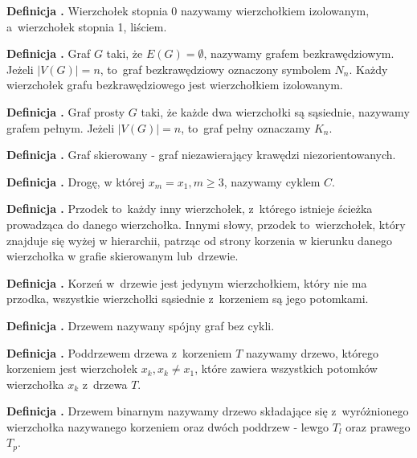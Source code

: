 \noindent
\textbf{Definicja .}
\incrementdefinitionIndex
Wierzchołek stopnia 0 nazywamy wierzchołkiem izolowanym, a~wierzchołek stopnia 1, liściem.

\noindent
\textbf{Definicja .}
\incrementdefinitionIndex
Graf $G$ taki, że $E(G) = \emptyset$, nazywamy grafem bezkrawędziowym. Jeżeli $|V(G)| = n$, to~graf bezkrawędziowy oznaczony symbolem $N_n$.
Każdy wierzchołek grafu bezkrawędziowego jest wierzchołkiem izolowanym.

\noindent
\textbf{Definicja .}
\incrementdefinitionIndex
Graf prosty $G$ taki, że każde dwa wierzchołki są sąsiednie, nazywamy grafem pełnym.
Jeżeli $|V(G)| = n$, to~graf pełny oznaczamy $K_n$.

\noindent
\textbf{Definicja .}
\incrementdefinitionIndex
Graf skierowany - graf niezawierający krawędzi niezorientowanych.

\noindent
\textbf{Definicja .}
\incrementdefinitionIndex
Drogę, w której $x_m = x_1, m \geqslant 3$, nazywamy cyklem $C$.

\noindent
\textbf{Definicja .}
\incrementdefinitionIndex
Przodek to~każdy inny wierzchołek, z~którego istnieje ścieżka prowadząca do danego wierzchołka.
Innymi słowy, przodek to~wierzchołek, który znajduje się wyżej w hierarchii,
patrząc od strony korzenia w kierunku danego wierzchołka w grafie skierowanym lub~drzewie.

\noindent
\textbf{Definicja .}
\incrementdefinitionIndex
Korzeń w~drzewie jest jedynym wierzchołkiem,
który nie ma przodka, wszystkie wierzchołki sąsiednie z~korzeniem są jego potomkami.

\noindent
\textbf{Definicja .}
\incrementdefinitionIndex
Drzewem nazywany spójny graf bez cykli.

\noindent
\textbf{Definicja .}
\incrementdefinitionIndex
Poddrzewem drzewa z~korzeniem $T$ nazywamy drzewo, którego korzeniem jest wierzchołek $x_k, x_k \neq x_1$,
które zawiera wszystkich potomków wierzchołka $x_k$ z~drzewa $T$.

\noindent
\textbf{Definicja .}
\incrementdefinitionIndex
Drzewem binarnym nazywamy drzewo składające się z~wyróżnionego wierzchołka nazywanego korzeniem oraz dwóch poddrzew
- lewgo $T_l$ oraz prawego $T_p$.